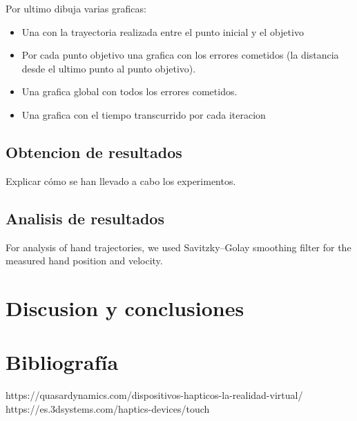\documentclass[a4paper,11pt, oneside]{book}
\begin{document}
Por ultimo dibuja varias graficas:
\begin{itemize}
	\item Una con la trayectoria realizada entre el punto inicial y el objetivo
	\item Por cada punto objetivo una grafica con los errores cometidos (la distancia desde el ultimo punto al punto objetivo).
	\item Una grafica global con todos los errores cometidos.
	\item Una grafica con el tiempo transcurrido por cada iteracion
\end{itemize}

\section{Obtencion de resultados}

Explicar cómo se han llevado a cabo los experimentos.

\section{Analisis de resultados}


For analysis of hand trajectories, we used Savitzky–Golay
smoothing filter for the measured hand position and velocity.
\chapter{Discusion y conclusiones}


\chapter{Bibliografía}
https://quasardynamics.com/dispositivos-hapticos-la-realidad-virtual/
https://es.3dsystems.com/haptics-devices/touch
\end{document}
